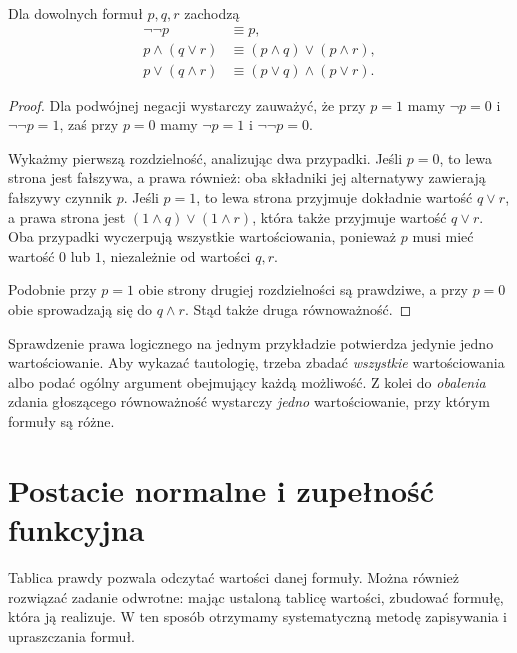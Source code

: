 \begin{twierdzenie}
\label{thm:logic-distributivity}
Dla dowolnych formuł $p,q,r$ zachodzą
\begin{align*}
\neg\neg p&\equiv p,\\
p\land(q\lor r)&\equiv(p\land q)\lor(p\land r),\\
p\lor(q\land r)&\equiv(p\lor q)\land(p\lor r).
\end{align*}
\end{twierdzenie}
\begin{proof}
Dla podwójnej negacji wystarczy zauważyć, że przy
$p=1$ mamy $\neg p=0$ i $\neg\neg p=1$, zaś przy
$p=0$ mamy $\neg p=1$ i $\neg\neg p=0$.

Wykażmy pierwszą rozdzielność, analizując dwa przypadki.
Jeśli $p=0$, to lewa strona jest fałszywa, a prawa
również: oba składniki jej alternatywy zawierają
fałszywy czynnik $p$. Jeśli $p=1$, to lewa strona
przyjmuje dokładnie wartość $q\lor r$, a prawa strona
jest $(1\land q)\lor(1\land r)$, która także
przyjmuje wartość $q\lor r$. Oba przypadki wyczerpują
wszystkie wartościowania, ponieważ $p$ musi mieć wartość
$0$ lub $1$, niezależnie od wartości $q,r$.

Podobnie przy $p=1$ obie strony drugiej rozdzielności
są prawdziwe, a przy $p=0$ obie sprowadzają się do
$q\land r$. Stąd także druga równoważność.
\end{proof}

\begin{uwaga}
Sprawdzenie prawa logicznego na jednym przykładzie potwierdza
jedynie jedno wartościowanie. Aby wykazać tautologię,
trzeba zbadać \emph{wszystkie} wartościowania albo podać
ogólny argument obejmujący każdą możliwość. Z kolei do
\emph{obalenia} zdania głoszącego równoważność wystarczy
\emph{jedno} wartościowanie, przy którym formuły są różne.
\end{uwaga}

\section{Postacie normalne i zupełność funkcyjna}
\label{sec:lst-propositional-normal-forms}
Tablica prawdy pozwala odczytać wartości danej formuły.
Można również rozwiązać zadanie odwrotne: mając ustaloną
tablicę wartości, zbudować formułę, która ją realizuje.
W ten sposób otrzymamy systematyczną metodę zapisywania
i upraszczania formuł.

